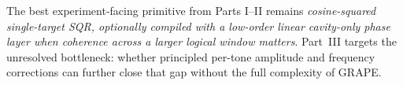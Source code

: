 \documentclass[11pt]{article}
\begin{document}
The best experiment-facing primitive from Parts I--II remains
\emph{cosine-squared single-target SQR, optionally compiled with a low-order
linear cavity-only phase layer when coherence across a larger logical window
matters}.  Part~III targets the unresolved bottleneck: whether principled
per-tone amplitude and frequency corrections can further close that gap without
the full complexity of GRAPE.
\end{document}
